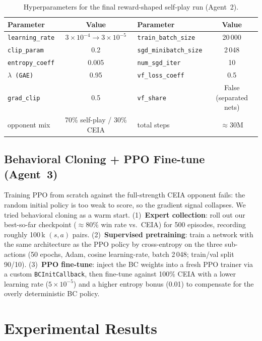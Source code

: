 \documentclass{article}
\begin{document}
\begin{table}[h]
\centering\small
\caption{Hyperparameters for the final reward-shaped self-play run (Agent~2).}
\label{tab:hp}
\begin{tabular}{l c l c}
\toprule
Parameter & Value & Parameter & Value \\
\midrule
\texttt{learning\_rate}     & $3\!\times\!10^{-4}\!\to\!3\!\times\!10^{-5}$ &
\texttt{train\_batch\_size} & 20\,000 \\
\texttt{clip\_param}        & 0.2  &
\texttt{sgd\_minibatch\_size} & 2\,048 \\
\texttt{entropy\_coeff}     & 0.005 &
\texttt{num\_sgd\_iter}     & 10 \\
\texttt{$\lambda$ (GAE)}    & 0.95 &
\texttt{vf\_loss\_coeff}    & 0.5 \\
\texttt{grad\_clip}         & 0.5  &
\texttt{vf\_share}          & False (separated nets) \\
opponent mix                & 70\% self-play / 30\% CEIA &
total steps                 & $\approx 30$M \\
\bottomrule
\end{tabular}
\end{table}

\subsection{Behavioral Cloning + PPO Fine-tune (Agent~3)}
\label{sec:bc}

Training PPO from scratch against the full-strength CEIA opponent fails: the random
initial policy is too weak to score, so the gradient signal collapses. We tried
behavioral cloning as a warm start.
(1)~\textbf{Expert collection}: roll out our best-so-far checkpoint (\(\approx\!80\%\)
win rate vs.\ CEIA) for 500 episodes, recording roughly 100\,k
$(s,a)$ pairs. (2)~\textbf{Supervised pretraining}: train a network with the same
architecture as the PPO policy by cross-entropy on the three sub-actions
(50 epochs, Adam, cosine learning-rate, batch 2\,048; train/val split 90/10).
(3)~\textbf{PPO fine-tune}: inject the BC weights into a fresh PPO trainer via a
custom \texttt{BCInitCallback}, then fine-tune against 100\% CEIA with a lower learning
rate ($5\!\times\!10^{-5}$) and a higher entropy bonus (0.01) to compensate for the
overly deterministic BC policy.

\section{Experimental Results}
\label{sec:results}
\end{document}
